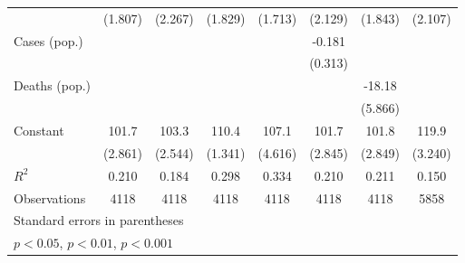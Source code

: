 \documentclass{article}
\begin{document}
{\begin{longtable}{l*{7}{c}}
                &  (1.807)         &  (2.267)         &  (1.829)         &  (1.713)         &  (2.129)         &  (1.843)         &  (2.107)         \\
Cases (pop.)    &                  &                  &                  &                  &   -0.181         &                  &                  \\
                &                  &                  &                  &                  &  (0.313)         &                  &                  \\
Deaths (pop.)   &                  &                  &                  &                  &                  &   -18.18\sym{**} &                  \\
                &                  &                  &                  &                  &                  &  (5.866)         &                  \\
Constant        &    101.7\sym{***}&    103.3\sym{***}&    110.4\sym{***}&    107.1\sym{***}&    101.7\sym{***}&    101.8\sym{***}&    119.9\sym{***}\\
                &  (2.861)         &  (2.544)         &  (1.341)         &  (4.616)         &  (2.845)         &  (2.849)         &  (3.240)         \\
\hline
\(R^{2}\)       &    0.210         &    0.184         &    0.298         &    0.334         &    0.210         &    0.211         &    0.150         \\
Observations    &     4118         &     4118         &     4118         &     4118         &     4118         &     4118         &     5858         \\
\hline\hline
\multicolumn{8}{l}{\footnotesize Standard errors in parentheses}\\
\multicolumn{8}{l}{\footnotesize \sym{*} \(p<0.05\), \sym{**} \(p<0.01\), \sym{***} \(p<0.001\)}\\
\end{longtable}
}
\end{document}
